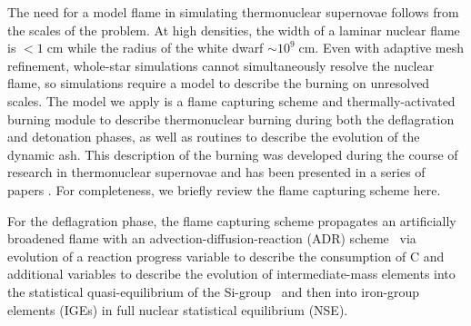 \documentclass[preprint2]{aastex63}
\begin{document}
The need for a model flame in simulating thermonuclear supernovae follows
from the scales of the problem. At high densities, the width of a laminar
nuclear flame is $< 1\ensuremath{\;}{\ensuremath{\mathrm{cm}}}$ while the
radius of the white dwarf $\sim 10^9\ensuremath{\;}{\ensuremath{\mathrm{cm}}}$.
Even with adaptive mesh refinement, whole-star simulations cannot
simultaneously resolve the nuclear flame, so simulations require a model to
describe the burning on unresolved scales.  The model we apply is a flame
capturing scheme and thermally-activated burning module to describe
thermonuclear burning during both the deflagration and detonation phases,
as well as routines to describe the evolution of the dynamic ash.
This description of the burning was developed during the course of research in
thermonuclear supernovae and has been presented in a series of
papers \citep[See][and references therein]{townetal2016,chandlery}. For completeness,
we briefly review the flame capturing scheme here.

For the deflagration phase, the flame capturing scheme propagates an
artificially broadened flame with an advection-diffusion-reaction (ADR)
scheme~\citep{Khok95,VladWeirRyzh06} via evolution of
a reaction progress variable to describe the consumption of C
and additional variables to describe the evolution of intermediate-mass
elements into the statistical quasi-equilibrium of the
Si-group~\citep{ifk1981,khok1981,khok1983} and then into iron-group elements
(IGEs) in full nuclear statistical equilibrium (NSE).
\end{document}
